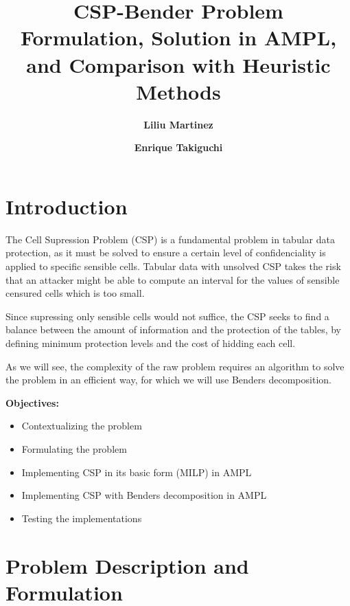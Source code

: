 \documentclass[11pt,a4paper]{article}
\title{\textbf{CSP-Bender Problem}\\
\large Formulation, Solution in AMPL, and Comparison with Heuristic Methods}
\author{
  \textbf{Liliu Martinez} \and
  \textbf{Enrique Takiguchi} \\  
}
\date{}
\begin{document}
\maketitle

\tableofcontents
\newpage

\section{Introduction}
\label{sec:intro}

The Cell Supression Problem (CSP) is a fundamental problem in tabular data protection,
as it must be solved to ensure a certain level of confidenciality is applied to specific
sensible cells. Tabular data with unsolved CSP takes the risk that an attacker might be 
able to compute an interval for the values of sensible censured cells which is too small.

Since supressing only sensible cells would not suffice, the CSP seeks to find a balance
between the amount of information and the protection of the tables, by defining minimum
protection levels and the cost of hidding each cell.

As we will see, the complexity of the raw problem requires an algorithm to solve the problem
in an efficient way, for which we will use Benders decomposition.


\textbf{Objectives:}
\begin{itemize}[noitemsep]
  \item Contextualizing the problem
  \item Formulating the problem
  \item Implementing CSP in its basic form (MILP) in AMPL
  \item Implementing CSP with Benders decomposition in AMPL
  \item Testing the implementations
  
\end{itemize}

\section{Problem Description and Formulation}
\label{sec:prob-descr}
\end{document}
